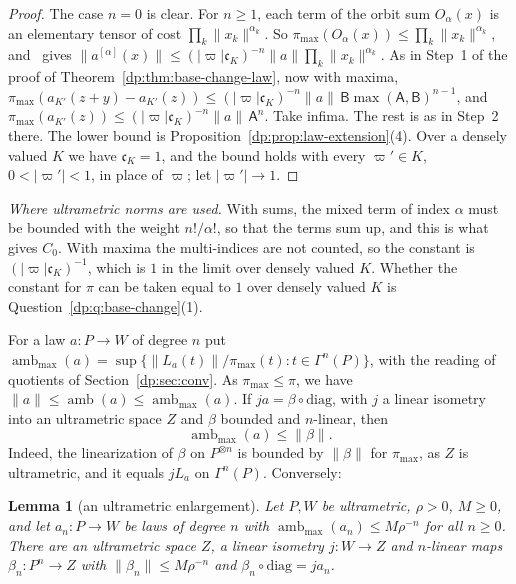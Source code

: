 \documentclass[11pt]{amsart}
\newtheorem{lemma}[theorem]{Lemma}
\theoremstyle{definition}
\theoremstyle{remark}
\numberwithin{equation}{section}
\newcommand{\abs}[1]{\lvert #1\rvert}
\newcommand{\norm}[1]{\lVert #1\rVert}
\theoremstyle{plain}
\theoremstyle{definition}
\theoremstyle{plain}
\begin{document}
\begin{proof}
The case $n=0$ is clear. For $n\ge1$, each term of the orbit sum $O_\alpha(x)$ is an elementary tensor of cost $\prod_k\norm{x_k}^{\alpha_k}$. So $\pi_{\max}(O_\alpha(x))\le\prod_k\norm{x_k}^{\alpha_k}$, and~\cite[Theorem~14.39(1), (14.9)]{I} gives $\norm{a^{[\alpha]}(x)}\le(\abs\varpi\mathfrak c_K)^{-n}\norm a\prod_k\norm{x_k}^{\alpha_k}$. As in Step~1 of the proof of Theorem~\ref{dp:thm:base-change-law}, now with maxima, $\pi_{\max}(a_{K'}(z+y)-a_{K'}(z))\le(\abs\varpi\mathfrak c_K)^{-n}\norm a\,\mathsf B\max(\mathsf A,\mathsf B)^{n-1}$, and $\pi_{\max}(a_{K'}(z))\le(\abs\varpi\mathfrak c_K)^{-n}\norm a\,\mathsf A^n$. Take infima. The rest is as in Step~2 there. The lower bound is Proposition~\ref{dp:prop:law-extension}(4). Over a densely valued $K$ we have $\mathfrak c_K=1$, and the bound holds with every $\varpi'\in K$, $0<\abs{\varpi'}<1$, in place of $\varpi$; let $\abs{\varpi'}\to1$.
\end{proof}

\emph{Where ultrametric norms are used.} With sums, the mixed term of index $\alpha$ must be bounded with the weight $n!/\alpha!$, so that the terms sum up, and this is what gives $C_0$. With maxima the multi-indices are not counted, so the constant is $(\abs\varpi\mathfrak c_K)^{-1}$, which is $1$ in the limit over densely valued $K$. Whether the constant for $\pi$ can be taken equal to $1$ over densely valued $K$ is Question~\ref{dp:q:base-change}(1).

For a law $a\colon P\to W$ of degree $n$ put $\operatorname{amb}_{\max}(a)=\sup\{\norm{L_a(t)}/\pi_{\max}(t):t\in\Gamma^n(P)\}$, with the reading of quotients of Section~\ref{dp:sec:conv}. As $\pi_{\max}\le\pi$, we have $\norm a\le\operatorname{amb}(a)\le\operatorname{amb}_{\max}(a)$. If $ja=\beta\circ\mathrm{diag}$, with $j$ a linear isometry into an ultrametric space $Z$ and $\beta$ bounded and $n$-linear, then
\begin{equation}\label{dp:bc:amb-rep}
 \operatorname{amb}_{\max}(a)\le\norm\beta.
\end{equation}
Indeed, the linearization of $\beta$ on $P^{\otimes n}$ is bounded by $\norm\beta$ for $\pi_{\max}$, as $Z$ is ultrametric, and it equals $jL_a$ on $\Gamma^n(P)$. Conversely:

\begin{lemma}[an ultrametric enlargement]\label{dp:bc:envelope}
Let $P,W$ be ultrametric, $\rho>0$, $M\ge0$, and let $a_n\colon P\to W$ be laws of degree $n$ with $\operatorname{amb}_{\max}(a_n)\le M\rho^{-n}$ for all $n\ge0$. There are an ultrametric space $Z$, a linear isometry $j\colon W\to Z$ and $n$-linear maps $\beta_n\colon P^n\to Z$ with $\norm{\beta_n}\le M\rho^{-n}$ and $\beta_n\circ\mathrm{diag}=ja_n$.
\end{lemma}
\end{document}

